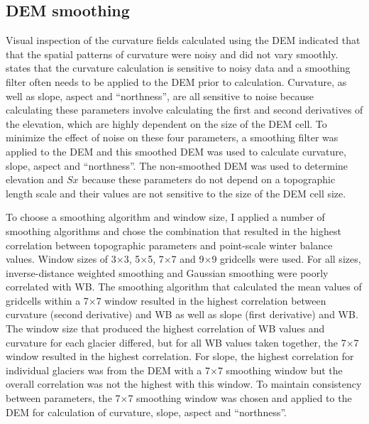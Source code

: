 \documentclass{sfuthesis}
\begin{document}
\subsection{DEM smoothing}

Visual inspection of the curvature fields calculated using the DEM indicated that that the spatial patterns of curvature were noisy and did not vary smoothly. \cite{Olaya2009} states that the curvature calculation is sensitive to noisy data and a smoothing filter often needs to be applied to the DEM prior to calculation. Curvature, as well as slope, aspect and ``northness'', are all sensitive to noise because calculating these parameters involve calculating the first and second derivatives of the elevation, which are highly dependent on the size of the DEM cell. To minimize the effect of noise on these four parameters, a smoothing filter was applied to the DEM and this smoothed DEM was used to calculate curvature, slope, aspect and ``northness''. The non-smoothed DEM was used to determine elevation and $Sx$ because these parameters do not depend on a topographic length scale and their values are not sensitive to the size of the DEM cell size.

To choose a smoothing algorithm and window size, I applied a number of smoothing algorithms and chose the combination that resulted in the highest correlation between topographic parameters and point-scale winter balance values. Window sizes of 3$\times$3, 5$\times$5, 7$\times$7 and 9$\times$9 gridcells were used. For all sizes, inverse-distance weighted smoothing and Gaussian smoothing were poorly correlated with WB. The smoothing algorithm that calculated the mean values of gridcells within a 7$\times$7 window resulted in the highest correlation between curvature (second derivative) and WB as well as slope (first derivative) and WB. The window size that produced the highest correlation of WB values and curvature for each glacier differed, but for all WB values taken together, the 7$\times$7 window resulted in the highest correlation. For slope, the highest correlation for individual glaciers was from the DEM with a 7$\times$7 smoothing window but the overall correlation was not the highest with this window. To maintain consistency between parameters, the 7$\times$7 smoothing window was chosen and applied to the DEM for calculation of curvature, slope, aspect and ``northness''. 
\end{document}
